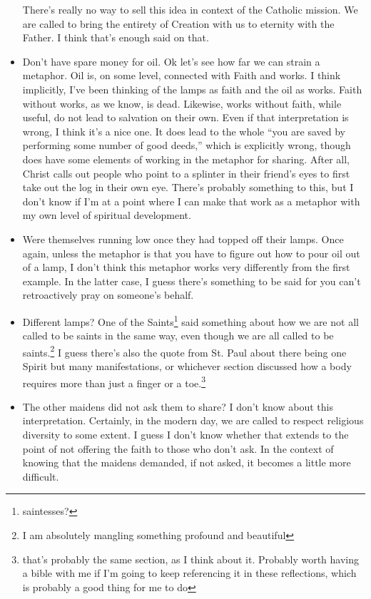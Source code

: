 \documentclass[12pt]{article}[titlepage]
\newcommand{\say}[1]{``#1''}
\newcommand{\1}{\={a}}
\newcommand{\2}{\={e}}
\newcommand{\3}{\={\i}}
\newcommand{\4}{\=o}
\newcommand{\5}{\=u}
\newcommand{\6}{\={A}}
\renewcommand{\,}{\textsuperscript{,}}
\begin{document}
\begin{itemize}
There's really no way to sell this idea in context of the Catholic mission.
We are called to bring the entirety of Creation with us to eternity with the Father.
I think that's enough said on that.
\item Don't have spare money for oil.
Ok let's see how far we can strain a metaphor.
Oil is, on some level, connected with Faith and works.
I think implicitly, I've been thinking of the lamps as faith and the oil as works.
Faith without works, as we know, is dead.
Likewise, works without faith, while useful, do not lead to salvation on their own.
Even if that interpretation is wrong, I think it's a nice one.
It does lead to the whole \say{you are saved by performing some number of good deeds,} which is explicitly wrong, though does have some elements of working in the metaphor for sharing.
After all, Christ calls out people who point to a splinter in their friend's eyes to first take out the log in their own eye.
There's probably something to this, but I don't know if I'm at a point where I can make that work as a metaphor with my own level of spiritual development.
\item Were themselves running low once they had topped off their lamps.
Once again, unless the metaphor is that you have to figure out how to pour oil out of a lamp, I don't think this metaphor works very differently from the first example.
In the latter case, I guess there's something to be said for you can't retroactively pray on someone's behalf.
\item Different lamps? 
One of the Saints\footnote{saintesses?} said something about how we are not all called to be saints in the same way, even though we are all called to be saints.\footnote{I am absolutely mangling something profound and beautiful}
I guess there's also the quote from St. Paul about there being one Spirit but many manifestations, or whichever section discussed how a body requires more than just a finger or a toe.\footnote{that's probably the same section, as I think about it.
Probably worth having a bible with me if I'm going to keep referencing it in these reflections, which is probably a good thing for me to do}
\item The other maidens did not ask them to share?
I don't know about this interpretation.
Certainly, in the modern day, we are called to respect religious diversity to some extent.
I guess I don't know whether that extends to the point of not offering the faith to those who don't ask.
In the context of knowing that the maidens demanded, if not asked, it becomes a little more difficult.

\end{itemize}
\end{document}
